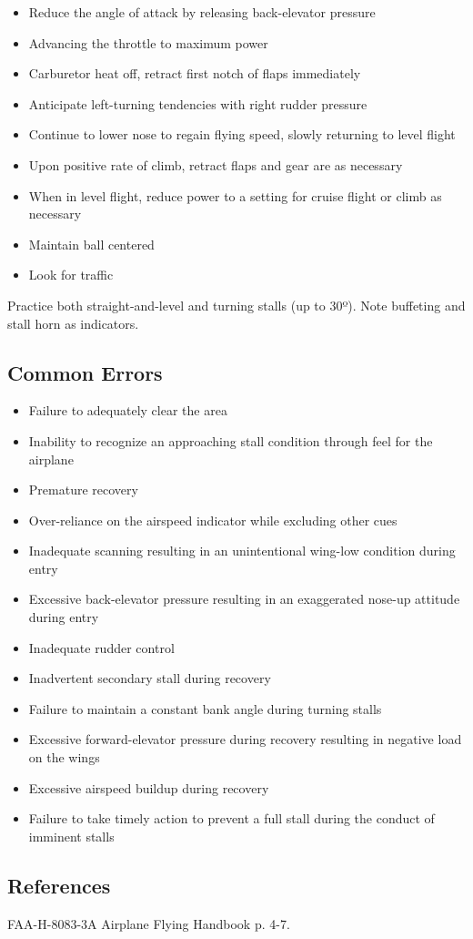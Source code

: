 \begin{itemize}
  \item Reduce the angle of attack by releasing back-elevator pressure
  \item Advancing the throttle to maximum power
  \item Carburetor heat off, retract first notch of flaps immediately
  \item Anticipate left-turning tendencies with right rudder pressure
  \item Continue to lower nose to regain flying speed, slowly returning to
    level flight
  \item Upon positive rate of climb, retract flaps and gear are as necessary 
  \item When in level flight, reduce power to a setting for cruise flight or
    climb as necessary
  \item Maintain ball centered
  \item Look for traffic
\end{itemize}

Practice both straight-and-level and turning stalls (up to 30º). Note buffeting
and stall horn as indicators.

\subsection{Common Errors}

\begin{itemize}
  \item Failure to adequately clear the area
  \item Inability to recognize an approaching stall condition through feel for
    the airplane
  \item Premature recovery
  \item Over-reliance on the airspeed indicator while excluding other cues
  \item Inadequate scanning resulting in an unintentional wing-low condition
    during entry
  \item Excessive back-elevator pressure resulting in an exaggerated nose-up
    attitude during entry
  \item Inadequate rudder control
  \item Inadvertent secondary stall during recovery
  \item Failure to maintain a constant bank angle during turning stalls
  \item Excessive forward-elevator pressure during recovery resulting in
    negative load on the wings
  \item Excessive airspeed buildup during recovery
  \item Failure to take timely action to prevent a full stall during the
    conduct of imminent stalls
\end{itemize}

\subsection{References}

FAA-H-8083-3A Airplane Flying Handbook p. 4-7.
